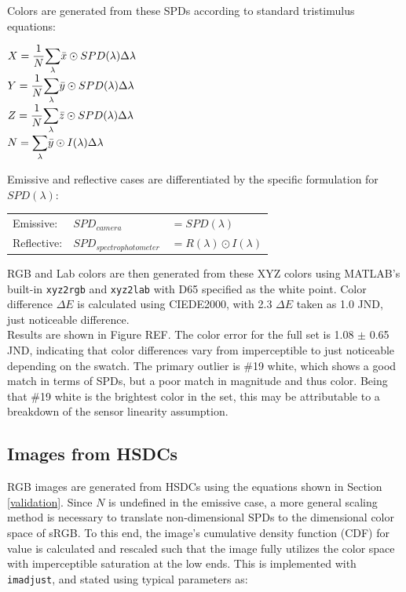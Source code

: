 \documentclass[twocolumn,10pt]{asme2ej}
\begin{document}
Colors are generated from these SPDs according to standard tristimulus equations:

$X = \dfrac{1}{N} \mathlarger{ \sum_{\lambda}} \bar{x} \odot SPD(\lambda) \Delta \lambda$\\
$Y = \dfrac{1}{N} \mathlarger{ \sum_{\lambda}} \bar{y} \odot SPD(\lambda) \Delta \lambda$\\
$Z = \dfrac{1}{N} \mathlarger{ \sum_{\lambda}} \bar{z} \odot SPD(\lambda) \Delta \lambda$\\
$N = \mathlarger{ \sum_{\lambda}} \bar{y} \odot I(\lambda) \Delta \lambda$

Emissive and reflective cases are differentiated by the specific formulation for $SPD(\lambda)$:\\

\begin{tabular}{l l l}
Emissive: &  $SPD_{camera}$ & $= SPD(\lambda)$\\
Reflective: & $SPD_{spectrophotometer}$ & $= R(\lambda) \odot I(\lambda)$\\
\end{tabular}

RGB and Lab colors are then generated from these XYZ colors using MATLAB's built-in \texttt{xyz2rgb} and \texttt{xyz2lab} with D65 specified as the white point. Color difference $\Delta E$ is calculated using CIEDE2000, with 2.3 $\Delta E$ taken as 1.0 JND, just noticeable difference.\\

Results are shown in Figure REF. The color error for the full set is 1.08 $\pm$ 0.65 JND, indicating that color differences vary from imperceptible to just noticeable depending on the swatch. The primary outlier is \#19 white, which shows a good match in terms of SPDs, but a poor match in magnitude and thus color. Being that \#19 white is the brightest color in the set, this may be attributable to a breakdown of the sensor linearity assumption.

\subsection{Images from HSDCs}

RGB images are generated from HSDCs using the equations shown in Section \ref{validation}. Since $N$ is undefined in the emissive case, a more general scaling method is necessary to translate non-dimensional SPDs to the dimensional color space of sRGB. To this end, the image's cumulative density function (CDF) for value is calculated and rescaled such that the image fully utilizes the color space with imperceptible saturation at the low ends. This is implemented with \texttt{imadjust}, and stated using typical parameters as:\\
\end{document}
